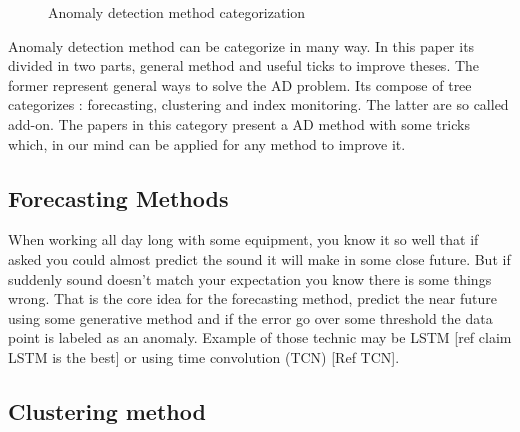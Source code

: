 \documentclass[../../main/main.tex]{subfiles}
\begin{document}
    \begin{figure*}[hp]
        \makebox[\textwidth]{}
        \caption{Anomaly detection method categorization}
    \end{figure*}

    Anomaly detection method can be categorize in many way. In this paper its divided in two parts,
    general method and useful ticks to improve theses. The former represent general ways to 
    solve the AD problem. Its compose of tree categorizes : forecasting, clustering and index monitoring.
    The latter are so called add-on. The papers in this category present a AD method with some tricks which,
    in our mind can be applied for any method to improve it.
    \subsection{Forecasting Methods}
        When working all day long with some equipment, you know it so well that if asked you could almost 
        predict the sound it will make in some close future. But if suddenly sound doesn't match 
        your expectation  you know there is some things wrong.
        That is the core idea for the forecasting method, predict the near future using some generative method
        and if the error go over some threshold the data point is labeled as an anomaly. Example of those technic 
        may be LSTM [ref claim LSTM is the best] or using time convolution (TCN) [Ref TCN].
    
    \subsection{Clustering method}
        
        
    
\end{document}
